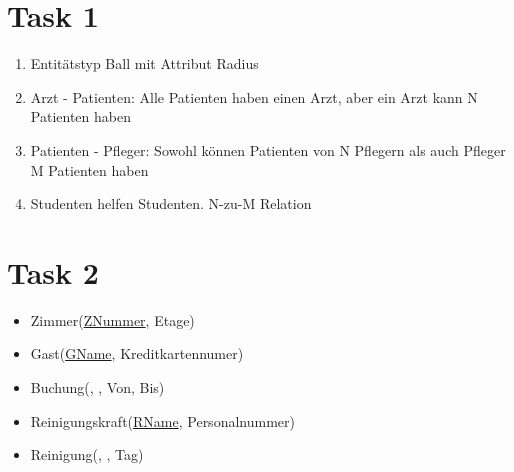 
\newcommand{\dozent}{Prof. Dr. Agnès Voisard \\ Nicolas Lehmann}					%
\newcommand{\tutor}{Alexander Schulz}						%
\newcommand{\tutoriumNo}{04}				%
\newcommand{\ubungNo}{03}									%
\newcommand{\veranstaltung}{Datenbanksysteme}	%
\newcommand{\semester}{SoSe 18}						%
\newcommand{\studenten}{Eduard Beiline, Mark Niehues, Antoen Oehler}			%

\usepackage[normalem]{ulem}





\section{Task 1}
\begin{enumerate}
\item Entitätstyp Ball mit Attribut Radius
\item Arzt - Patienten: Alle Patienten haben einen Arzt, aber ein Arzt kann N Patienten haben
\item Patienten - Pfleger: Sowohl können Patienten von N Pflegern als auch Pfleger M Patienten haben
\item Studenten helfen Studenten. N-zu-M Relation
\end{enumerate}

\section{Task 2}
\begin{itemize}
  \item Zimmer(\underline{ZNummer}, Etage)
  \item Gast(\underline{GName}, Kreditkartennumer)
  \item Buchung(, , Von, Bis)
  \item Reinigungskraft(\underline{RName}, Personalnummer)
  \item Reinigung(, , Tag)
\end{itemize}

